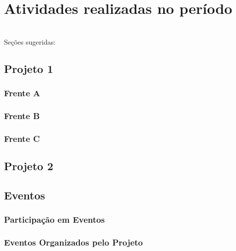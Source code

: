 \chapter{Atividades realizadas no período}

\lipsum[2] \\

Seções sugeridas:

\section{Projeto 1}

\subsection{Frente A}

\subsection{Frente B}

\subsection{Frente C}

\section{Projeto 2}

\section{Eventos}

\subsection{Participação em Eventos}

\subsection{Eventos Organizados pelo Projeto}
